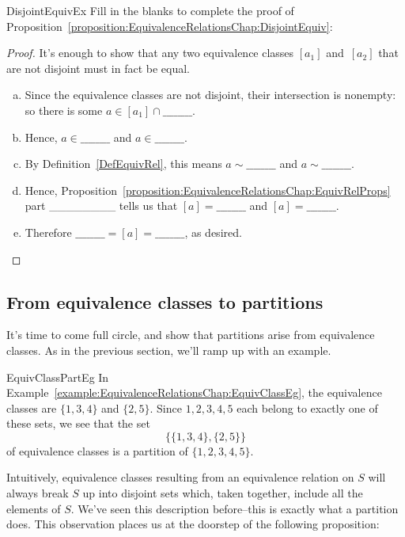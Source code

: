 \begin{exercise}{DisjointEquivEx}
Fill in the blanks to complete the proof of Proposition~\ref{proposition:EquivalenceRelationsChap:DisjointEquiv}:

\begin{proof}
It's enough to show that any two equivalence classes $[a_1]$ and~$[a_2]$ that are not disjoint must in fact be equal. 
\begin{enumerate}[(a)]
\item
Since the equivalence classes are not disjoint, their intersection is nonempty: so there is some $a \in [a_1] \cap \_\_\_\_\_\_\_\_$. 
\item
Hence, $a \in \_\_\_\_\_\_\_\_$ and $a \in \_\_\_\_\_\_\_\_$. 
\item
By Definition~\ref{DefEquivRel}, this means $a \sim \_\_\_\_\_\_\_\_$ and $a \sim \_\_\_\_\_\_\_\_$. 
\item
Hence, Proposition~\ref{proposition:EquivalenceRelationsChap:EquivRelProps} part \_\_\_\_\_\_\_\_  tells us that $[a] =\_\_\_\_\_\_\_\_$ and $[a] =\_\_\_\_\_\_\_\_$. 
\item
Therefore $\_\_\_\_\_\_\_\_ = [a] = \_\_\_\_\_\_\_\_$, as desired.
\end{enumerate}
\end{proof}
\end{exercise}

\subsection{From equivalence classes to partitions}

It's time to come full circle, and show that partitions arise from equivalence classes. As in the previous section, we'll ramp up with an example.

\begin{example}{EquivClassPartEg}
In Example~\ref{example:EquivalenceRelationsChap:EquivClassEg}, the equivalence classes are $\{1,3,4\}$ and $\{2,5\}$. Since $1,2,3,4,5$ each belong to exactly one of these sets, we see that the set
	$$ \bigl\{ \{1,3,4\}, \{2,5\} \bigr\} $$
of equivalence classes is a partition of $\{1,2, 3,4,5\}$.
\end{example}

Intuitively, equivalence classes resulting from an equivalence relation on $S$ will always break $S$ up into disjoint sets which, taken together, include all the elements of $S$. We've seen this description before--this is exactly what a partition does. This observation places us at the doorstep of the following proposition:

